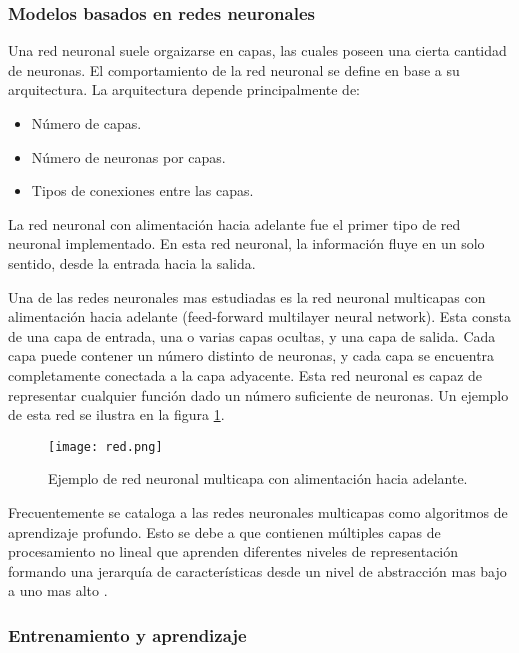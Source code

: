 \subsubsection{Modelos basados en redes neuronales}

Una red neuronal suele orgaizarse en capas, las cuales poseen una cierta cantidad de neuronas. El comportamiento de la red neuronal se define en base a su arquitectura. La arquitectura depende principalmente de:
\begin{itemize}
\item Número de capas.
\item Número de neuronas por capas.
\item Tipos de conexiones entre las capas.
\end{itemize}

La red neuronal con alimentación hacia adelante fue el primer tipo de red neuronal implementado. En esta red neuronal, la información fluye en un solo sentido, desde la entrada hacia la salida. 

Una de las redes neuronales mas estudiadas es la red neuronal multicapas con alimentación hacia adelante (feed-forward multilayer neural network). Esta consta de una capa de entrada, una o varias capas ocultas, y una capa de salida. Cada capa puede contener un número distinto de neuronas, y cada capa se encuentra completamente conectada a la capa adyacente. Esta red neuronal es capaz de representar cualquier función dado un número suficiente de neuronas. Un ejemplo de esta red se ilustra en la figura \ref{fig:red}.

\begin{figure}[H]
  \centering{}
  \texttt{[image: red.png]}
  \caption{Ejemplo de red neuronal multicapa con alimentación hacia adelante.}
  \label{fig:red}
\end{figure}

Frecuentemente se cataloga a las redes neuronales multicapas como algoritmos de aprendizaje profundo. Esto se debe a que contienen múltiples capas de procesamiento no lineal que aprenden diferentes niveles de representación formando una jerarquía de características desde un nivel de abstracción mas bajo a uno mas alto \cite{franchute}.  

\subsubsection{Entrenamiento y aprendizaje}

